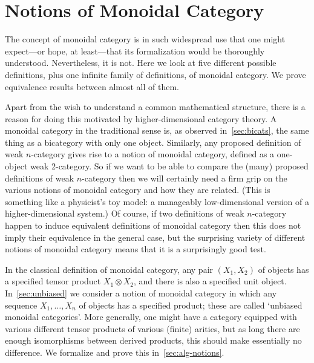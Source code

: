 
\chapter{Notions of Monoidal Category}



\noindent
The concept of monoidal category is in such widespread use that one might
expect---or hope, at least---that its formalization would be thoroughly
understood.  Nevertheless, it is not.  Here we look at five different
possible definitions, plus one infinite family of definitions, of monoidal
category.  We prove equivalence results between almost all of them.

Apart from the wish to understand a common mathematical structure, there is
a reason for doing this motivated by higher-dimensional category theory.  A
monoidal category in the traditional sense is, as observed
in~\ref{sec:bicats}, 
the same thing as a bicategory with only one object.  Similarly, any
proposed definition of weak $n$-category gives rise to a notion of monoidal
category, defined as a one-object weak 2-category.  So if we want to be
able to compare the (many) proposed definitions%
%
%
of weak $n$-category then
we will certainly need a firm grip on the various notions of monoidal
category and how they are related.  (This is something like a physicist's
toy model: a manageably low-dimensional version of a higher-dimensional
system.)  Of course, if two definitions of weak $n$-category happen to
induce equivalent definitions of monoidal category then this does not imply
their equivalence in the general case, but the surprising variety of
different notions of monoidal category means that it is a surprisingly good
test.

In the classical definition of monoidal category, any pair $(X_1, X_2)$ of
objects has a specified tensor product $X_1 \otimes X_2$, and there is also
a specified unit object.  In~\ref{sec:unbiased} we consider a notion of
monoidal category in which any sequence $X_1, \ldots, X_n$ of objects has a
specified product; these are called `unbiased monoidal categories'.  More
generally, one might have a category equipped with various different tensor
products of various (finite) arities, but as long there are enough
isomorphisms between derived products, this should make essentially no
difference.  We formalize and prove this in~\ref{sec:alg-notions}.  

